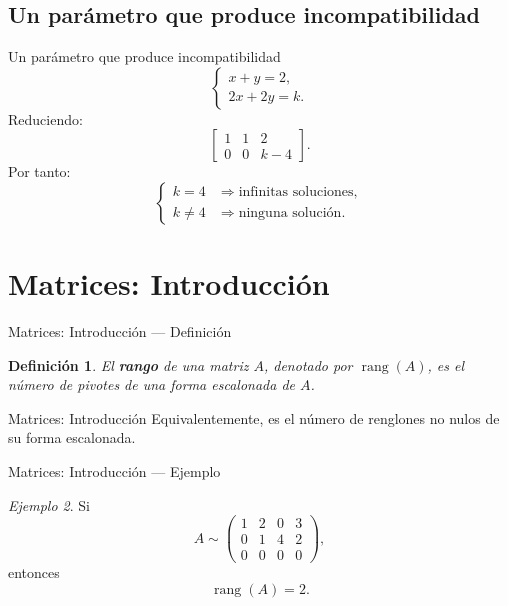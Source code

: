 \documentclass[aspectratio=169,11pt]{beamer}
\newtheorem{definicion}{Definición}[section]
\theoremstyle{remark}
\newtheorem{ejemplo}[definicion]{Ejemplo}
\newcommand{\rank}{\operatorname{rang}}
\begin{document}
\subsection*{Un parámetro que produce incompatibilidad}
\begin{frame}[allowframebreaks]{Un parámetro que produce incompatibilidad}
\footnotesize
\[
\begin{cases}
x+y=2,\\
2x+2y=k.
\end{cases}
\]
Reduciendo:
\[
\left[
\begin{array}{cc|c}
1&1&2\\
0&0&k-4
\end{array}
\right].
\]
Por tanto:
\[
\begin{cases}
k=4 &\Longrightarrow \text{infinitas soluciones},\\
k\neq4 &\Longrightarrow \text{ninguna solución}.
\end{cases}
\]
\end{frame}

\section{Matrices: Introducci\'on}
\begin{frame}[shrink=5]{Matrices: Introducci\'on — Definición}
\footnotesize
\begin{definicion}
El \textbf{rango} de una matriz $A$, denotado por $\rank(A)$, es el número de pivotes de una forma escalonada de $A$.
\end{definicion}
\end{frame}

\begin{frame}[allowframebreaks]{Matrices: Introducci\'on}
\footnotesize
Equivalentemente, es el número de renglones no nulos de su forma escalonada.
\end{frame}

\begin{frame}[shrink=5]{Matrices: Introducci\'on — Ejemplo}
\footnotesize
\begin{ejemplo}
Si
\[
A\sim
\begin{pmatrix}
1&2&0&3\\
0&1&4&2\\
0&0&0&0
\end{pmatrix},
\]
entonces
\[
\rank(A)=2.
\]
\end{ejemplo}
\end{frame}
\end{document}
